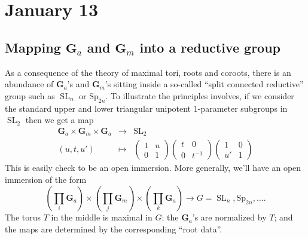 \documentclass[10pt]{article}
\newcommand{\SL}{\operatorname{SL}}
\renewcommand{\(}{\left(}
\renewcommand{\)}{\right)}
\renewcommand{\u}{\mathfrak{u}}
\newcommand{\Sp}{\mathrm{Sp}}
\numberwithin{thm}{subsection}
\begin{document}
\section{January 13}
\subsection{Mapping $\mathbf{G}_a$ and $\mathbf{G}_m$ into a reductive group}
As a  consequence of the theory of maximal tori, roots and coroots, there is an abundance of $\mathbf{G}_a$'s and 
$\mathbf{G}_m$'s sitting inside a so-called ``split connected reductive'' group such as $\SL_n$ or $\Sp_{2n}$.
To illustrate the principles involves, if we consider the standard upper and lower triangular
unipotent 1-parameter subgroups in $\SL_2$ then we get a map
\begin{eqnarray*}\mathbf{G}_a\times\mathbf{G}_m\times \mathbf{G}_a&\to&\SL_2\\
(u,t,u')&\mapsto&\(\begin{smallmatrix}1&u\\0&1\end{smallmatrix}\)\(\begin{smallmatrix}t&0\\0&t^{-1}\end{smallmatrix}\)\(\begin{smallmatrix}1&0\\u'&1\end{smallmatrix}\)\end{eqnarray*}
This is easily check to be an open immersion.
More generally, we'll have an open immersion of the form
\[(\prod_i\mathbf{G}_a)\times(\prod_j \mathbf{G}_m)\times(\prod_k \mathbf{G}_a)\to G=\SL_n,\Sp_{2n},\ldots.\]
The torus $T$ in the middle is maximal in $G$;
the $\mathbf{G}_a$'s are normalized by $T$; and the maps are determined by the corresponding ``root data''.
\end{document}
